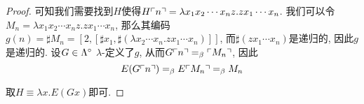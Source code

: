 \begin{proof}
    可知我们需要找到$H$使得$H\ulcorner{n}\urcorner=\lambda x_1x_2\cdots x_nz. zx_1\cdots x_n$.
    我们可以令$M_n=\lambda x_1x_2\cdots x_nz. zx_1\cdots x_n$, 那么其编码$g(n)=\sharp M_n=[2,[\sharp x_1, \sharp (\lambda x_2\cdots x_n.zx_1\cdots x_n)]]$, 而$\sharp (zx_1\cdots x_n)$是递归的, 因此$g$是递归的. 设$G\in\Lambda^\circ$ $\lambda$-定义了$g$, 从而$G\ulcorner{n}\urcorner=_{\beta}\ulcorner{M_n}\urcorner$, 因此
    $$E(G\ulcorner{n}\urcorner)=_{\beta} E\ulcorner{M_n}\urcorner=_{\beta} M_n$$
    
    取$H\equiv \lambda x.E(Gx)$即可.
\end{proof}